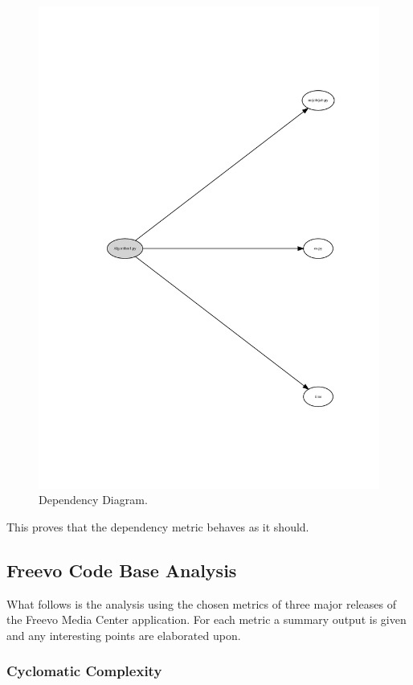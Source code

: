 \documentclass[10.5pt,journal, a4paper]{IEEEtran}
\begin{document}
 \begin{figure}[H]
 \centering 
 \includegraphics[width=\columnwidth]{Algo1}
 \centering 
  \caption {Dependency Diagram. }
 \end{figure}

This proves that the dependency metric behaves as it should. 




\subsection{Freevo Code Base Analysis} 
\noindent
What follows is the analysis using the chosen metrics of three major releases of the Freevo Media Center application. For each metric a summary output is given and any interesting points are elaborated upon. 

\subsubsection{Cyclomatic Complexity}
\end{document}
